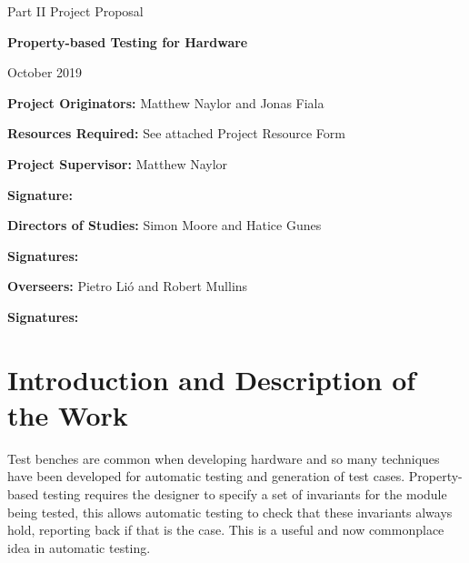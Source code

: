 \documentclass[UKenglish, 12pt]{article}
\begin{document}
\thispagestyle{empty}

\medskip
{}
\medskip
{}

\vfil

\centerline{\large Part II Project Proposal}
\vspace{0.4in}
\centerline{\Large\bf Property-based Testing for Hardware}
\vspace{0.3in}
\centerline{\large{October 2019}}

\vfil

{\bf Project Originators:} {Matthew Naylor and Jonas Fiala}

\vspace{0.1in}

{\bf Resources Required:} See attached Project Resource Form

\vspace{0.5in}

{\bf Project Supervisor:} {Matthew Naylor}

\vspace{0.2in}

{\bf Signature:}

\vspace{0.5in}

{\bf Directors of Studies:} {Simon Moore and Hatice Gunes}

\vspace{0.2in}

{\bf Signatures:}

\vspace{0.5in}

{\bf Overseers:} {Pietro Li\'o} and {Robert Mullins}

\vspace{0.2in}

{\bf Signatures:}

\vfil
\eject


\section*{Introduction and Description of the Work}

Test benches are common when developing hardware and so many techniques have
been developed for automatic testing and generation of test cases. Property-based
testing requires the designer to specify a set of invariants for the module being tested, this allows automatic testing to check that these invariants always hold, reporting back if that is the case. This is a useful and now commonplace idea in automatic testing.
\end{document}
